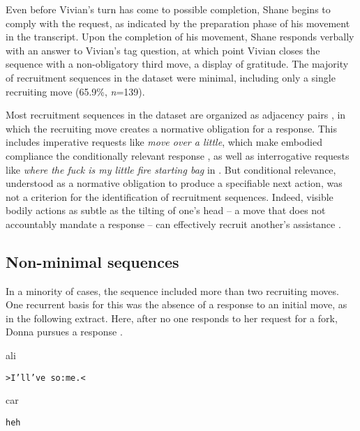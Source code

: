 \documentclass[output=paper,nonflat,modfont,draft]{langsci/langscibook}
\begin{document}
Even before Vivian’s turn has come to possible completion, Shane begins to comply with the request, as indicated by the preparation phase of his movement in the transcript. Upon the completion of his movement, Shane responds verbally with an answer to Vivian’s tag question, at which point Vivian closes the sequence with a non-obligatory third move, a display of gratitude. The majority of recruitment sequences in the dataset were minimal, including only a single recruiting move (65.9\%, \textit{n}=139).

Most recruitment sequences in the dataset are organized as adjacency pairs \citep{SchegloffSacks1973, Sacks1992, schegloff_sequence_2007}, in which the recruiting move creates a normative obligation for a response. This includes imperative requests like \textit{move over a little}, which make embodied compliance the conditionally relevant response \citep{Goodwin2006,kent_compliance_2012}, as well as interrogative requests like \textit{where the fuck is my little fire starting bag} in . But conditional relevance, understood as a normative obligation to produce a specifiable next action, was not a criterion for the identification of recruitment sequences. Indeed, visible bodily actions as subtle as the tilting of one’s head -- a move that does not accountably mandate a response -- can effectively recruit another’s assistance \citep[see][8]{KendrickDrew2016}.

\subsection{Non-minimal sequences}
In a minority of cases, the sequence included more than two recruiting moves. One recurrent basis for this was the absence of a response to an initial move, as in the following extract. Here, after no one responds to her request for a fork, Donna pursues a response \citep{Pomerantz1984response, BoldenMandelbaumWilkinson2012}.


\begin{transbox}{1}{ali}
\begin{verbatim}
>I’ll’ve so:me.<
\end{verbatim}
\end{transbox}


\begin{transbox}{3}{car}
\begin{verbatim}
heh
\end{verbatim}
\end{transbox}
\end{document}
